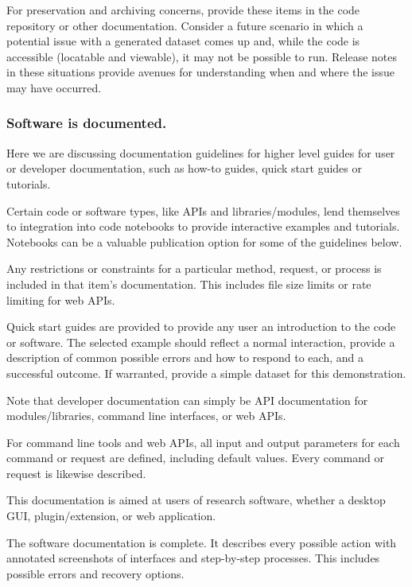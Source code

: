 \documentclass{article}
\newcounter{subsubsubsection}[subsubsection]
\begin{document}
For preservation and archiving concerns, provide these items in the code repository or other documentation. Consider a future scenario in which a potential issue with a generated dataset comes up and, while the code is accessible (locatable and viewable), it may not be possible to run. Release notes in these situations provide avenues for understanding when and where the issue may have occurred.

\subsubsection{Software is documented.}
Here we are discussing documentation guidelines for higher level guides for user or developer documentation, such as how-to guides, quick start guides or tutorials. 
 
Certain code or software types, like APIs and libraries/modules, lend themselves to integration into code notebooks to provide interactive examples and tutorials. Notebooks can be a valuable publication option for some of the guidelines below.

Any restrictions or constraints for a particular method, request, or process is included in that item’s documentation. This includes file size limits or rate limiting for web APIs.
 
Quick start guides are provided to provide any user an introduction to the code or software. The selected example should reflect a normal interaction, provide a description of common possible errors and how to respond to each, and a successful outcome. If warranted, provide a simple dataset for this demonstration. 

Note that developer documentation can simply be API documentation for modules/libraries, command line interfaces, or web APIs.
 
For command line tools and web APIs, all input and output parameters for each command or request are defined, including default values. Every command or request is likewise described.

This documentation is aimed at users of research software, whether a desktop GUI, plugin/extension, or web application. 
 
The software documentation is complete. It describes every possible action with annotated screenshots of interfaces and step-by-step processes. This includes possible errors and recovery options. 
 
\end{document}
